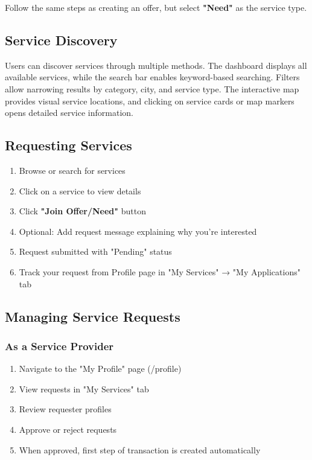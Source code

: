 \documentclass[12pt,a4paper]{report}
\begin{document}
Follow the same steps as creating an offer, but select \textbf{"Need"} as the service type.

\subsection{Service Discovery}

Users can discover services through multiple methods. The dashboard displays all available services, while the search bar enables keyword-based searching. Filters allow narrowing results by category, city, and service type. The interactive map provides visual service locations, and clicking on service cards or map markers opens detailed service information.

\subsection{Requesting Services}

\begin{enumerate}
    \item Browse or search for services
    \item Click on a service to view details
    \item Click \textbf{"Join Offer/Need"} button
    \item Optional: Add request message explaining why you're interested
    \item Request submitted with "Pending" status
    \item Track your request from Profile page in "My Services" → "My Applications" tab
\end{enumerate}

\subsection{Managing Service Requests}

\subsubsection{As a Service Provider}

\begin{enumerate}
    \item Navigate to the "My Profile" page (/profile)
    \item View requests in "My Services" tab
    \item Review requester profiles
    \item Approve or reject requests
    \item When approved, first step of transaction is created automatically
\end{enumerate}
\end{document}
